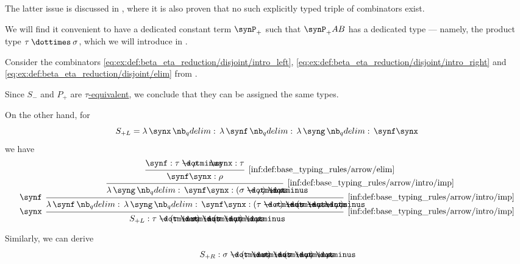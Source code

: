 \begin{example}
\begin{thmenum}
    The latter issue is discussed in \cite{MathOF:product_type_in_simply_typed_lambda_terms}, where it is also proven that no such explicitly typed triple of combinators exist.

    We will find it convenient to have a dedicated constant term \( \synP_+ \) such that \( \synP_+ A B \) has a dedicated type --- namely, the product type \( \tau \syntimes \sigma \), which we will introduce in .

     Consider the combinators \ref{eq:ex:def:beta_eta_reduction/disjoint/intro_left}, \ref{eq:ex:def:beta_eta_reduction/disjoint/intro_right} and \ref{eq:ex:def:beta_eta_reduction/disjoint/elim} from .

    Since \( S_- \) and \( P_+ \) are \hyperref[def:lambda_term_alpha_equivalence]{\( \tau \)-equivalent}, we conclude that they can be assigned the same types.

    On the other hand, for
    \begin{equation*}
      S_{+L} = \qabs \synx \qabs \synf \qabs \syng \synf \synx
    \end{equation*}
    we have
    \begin{equation*}
      \begin{prooftree}
        \hypo{ \synf: \tau \synimplies \rho }
        \hypo{ \synx: \tau }
        \infer2[\ref{inf:def:base_typing_rules/arrow/elim}]{ \synf \synx: \rho }
        \infer1[\ref{inf:def:base_typing_rules/arrow/intro/imp}]{ \qabs \syng \synf \synx: (\sigma \synimplies \rho) \synimplies \rho }
        \infer[left label=\( \synf \)]1[\ref{inf:def:base_typing_rules/arrow/intro/imp}]{ \qabs \synf \qabs \syng \synf \synx: (\tau \synimplies \sigma) \synimplies (\sigma \synimplies \rho \synimplies \rho) }
        \infer[left label=\( \synx \)]1[\ref{inf:def:base_typing_rules/arrow/intro/imp}]{ S_{+L}: \tau \synimplies (\tau \synimplies \sigma) \synimplies (\sigma \synimplies \rho) \synimplies \rho }
      \end{prooftree}
    \end{equation*}

    Similarly, we can derive
    \begin{equation*}
      S_{+R}: \sigma \synimplies (\tau \synimplies \sigma) \synimplies (\sigma \synimplies \rho) \synimplies \rho.
    \end{equation*}


\end{thmenum}
\end{example}
